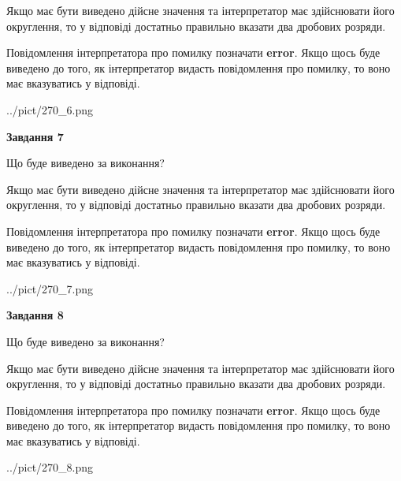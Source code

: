 \documentclass[12pt, ukrainian]{article}
\begin{document}
{\begin {Large}
Якщо має бути виведено дійсне значення та інтерпретатор має здійснювати його округлення, 
то у відповіді достатньо правильно вказати два дробових розряди.

Повідомлення інтерпретатора про помилку позначати \textbf{error}.
Якщо щось буде виведено до того, як інтерпретатор видасть повідомлення про помилку, 
то воно має вказуватись у відповіді. \par

\begin{center}
	{../pict/270_6.png}
\end{center}
\newpage

{\begin {center}\textbf{Завдання 7}\end {center}}\par
Що буде виведено за виконання? \par

Якщо має бути виведено дійсне значення та інтерпретатор має здійснювати його округлення, 
то у відповіді достатньо правильно вказати два дробових розряди.

Повідомлення інтерпретатора про помилку позначати \textbf{error}.
Якщо щось буде виведено до того, як інтерпретатор видасть повідомлення про помилку, 
то воно має вказуватись у відповіді. \par

\begin{center}
	{../pict/270_7.png}
\end{center}
\newpage

{\begin {center}\textbf{Завдання 8}\end {center}}\par
Що буде виведено за виконання? \par

Якщо має бути виведено дійсне значення та інтерпретатор має здійснювати його округлення, 
то у відповіді достатньо правильно вказати два дробових розряди.

Повідомлення інтерпретатора про помилку позначати \textbf{error}.
Якщо щось буде виведено до того, як інтерпретатор видасть повідомлення про помилку, 
то воно має вказуватись у відповіді. \par

\begin{center}
	{../pict/270_8.png}
\end{center}
\newpage


\end{Large}}
\end{document}
